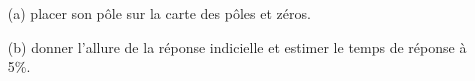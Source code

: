 \begin{itemize}
    \item[(a)] placer son pôle sur la carte des pôles et zéros.
    \item[(b)] donner l'allure de la réponse indicielle et estimer le temps
               de réponse à 5\%.
\end{itemize}
